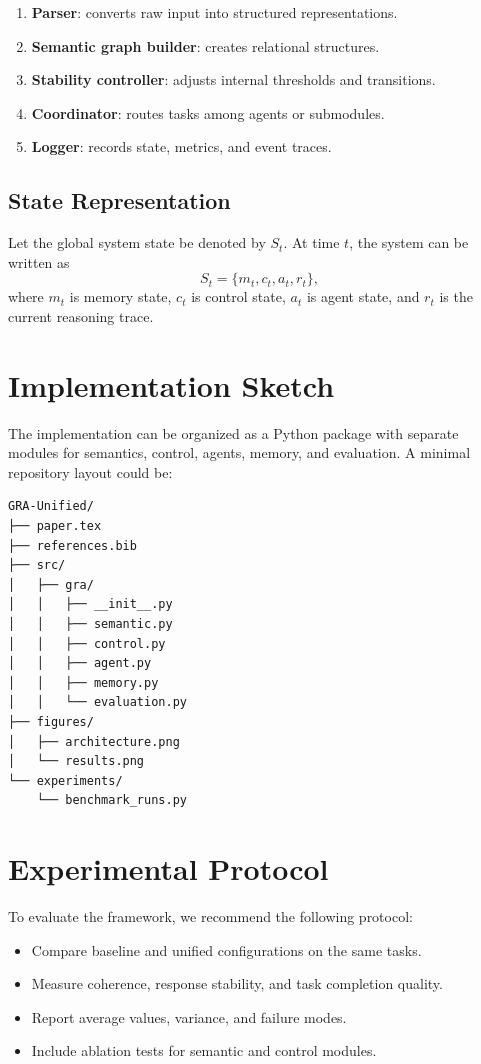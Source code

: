 \documentclass[11pt,a4paper]{article}
\begin{document}
\begin{enumerate}
    \item \textbf{Parser}: converts raw input into structured representations.
    \item \textbf{Semantic graph builder}: creates relational structures.
    \item \textbf{Stability controller}: adjusts internal thresholds and transitions.
    \item \textbf{Coordinator}: routes tasks among agents or submodules.
    \item \textbf{Logger}: records state, metrics, and event traces.
\end{enumerate}

\subsection{State Representation}
Let the global system state be denoted by \( S_t \). At time \( t \), the system can be written as
\[
S_t = \{m_t, c_t, a_t, r_t\},
\]
where \( m_t \) is memory state, \( c_t \) is control state, \( a_t \) is agent state, and \( r_t \) is the current reasoning trace.

\section{Implementation Sketch}
The implementation can be organized as a Python package with separate modules for semantics, control, agents, memory, and evaluation. A minimal repository layout could be:

\begin{lstlisting}[language=bash,caption={Example repository layout}]
GRA-Unified/
├── paper.tex
├── references.bib
├── src/
│   ├── gra/
│   │   ├── __init__.py
│   │   ├── semantic.py
│   │   ├── control.py
│   │   ├── agent.py
│   │   ├── memory.py
│   │   └── evaluation.py
├── figures/
│   ├── architecture.png
│   └── results.png
└── experiments/
    └── benchmark_runs.py
\end{lstlisting}

\section{Experimental Protocol}
To evaluate the framework, we recommend the following protocol:

\begin{itemize}
    \item Compare baseline and unified configurations on the same tasks.
    \item Measure coherence, response stability, and task completion quality.
    \item Report average values, variance, and failure modes.
    \item Include ablation tests for semantic and control modules.
\end{itemize}
\end{document}
